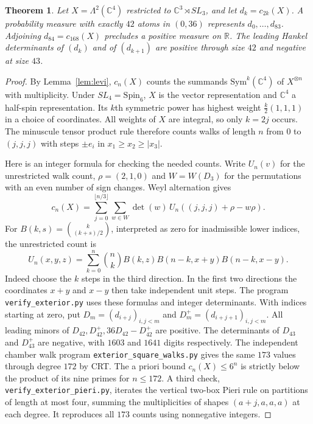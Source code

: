 \documentclass[11pt,reqno]{amsart}
\newtheorem{theorem}{Theorem}[section]
\theoremstyle{definition}
\newcommand{\RR}{\mathbb R}
\newcommand{\CC}{\mathbb C}
\begin{document}
\begin{theorem}\label{thm:exterior-doubled}
Let $X=\Lambda^2(\CC^4)$ restricted to $\CC^3\rtimes SL_3$, and let
$d_k=c_{2k}(X)$. A probability measure with exactly $42$ atoms in $(0,36)$ represents $d_0,\ldots,d_{83}$. Adjoining $d_{84}=c_{168}(X)$ precludes a positive measure on $\RR$. The leading Hankel determinants of $(d_k)$ and of $(d_{k+1})$
are positive through size $42$ and negative at size $43$.
\end{theorem}

\begin{proof}
By Lemma~\ref{lem:levi}, $c_n(X)$ counts the summands
$\mathrm{Sym}^k(\CC^4)$ of $X^{\otimes n}$ with multiplicity. Under
$SL_4=\mathrm{Spin}_6$, $X$ is the vector representation and $\CC^4$ a half-spin
representation. Its $k$th symmetric power has highest weight
$\tfrac k2(1,1,1)$ in a choice of coordinates. All weights of $X$
are integral, so only $k=2j$ occurs. The minuscule tensor product rule
therefore counts walks of length $n$ from $0$ to $(j,j,j)$ with steps
$\pm e_i$ in $x_1\ge x_2\ge|x_3|$.

Here is an integer formula for checking the needed counts.
Write $U_n(v)$ for the unrestricted walk count, $\rho=(2,1,0)$ and
$W=W(D_3)$ for the permutations with an even number of sign changes.
Weyl alternation \cite{GrabinerMagyar} gives
\[
 c_n(X)=\sum_{j=0}^{\lfloor n/3\rfloor}
        \sum_{w\in W}\det(w)\,U_n((j,j,j)+\rho-w\rho).
\]
For $B(k,s)=\binom{k}{(k+s)/2}$, interpreted as zero for inadmissible
lower indices, the unrestricted count is
\[
 U_n(x,y,z)=\sum_{k=0}^{n}\binom nk B(k,z) B(n-k,x+y) B(n-k,x-y).
\]
Indeed choose the $k$ steps in the third direction. In the first two
directions the coordinates $x+y$ and $x-y$ then take independent
unit steps. The program \texttt{verify\_exterior.py} uses these formulas
and integer determinants. With indices starting at zero, put
$D_m=(d_{i+j})_{i,j<m}$ and $D_m^+=(d_{i+j+1})_{i,j<m}$.
All leading minors of $D_{42},D_{42}^+,36D_{42}-D_{42}^+$ are positive.
The determinants of $D_{43}$ and $D_{43}^+$ are negative, with
$1603$ and $1641$ digits respectively. The independent chamber walk
program \texttt{exterior\_square\_walks.py} gives the same $173$ values
through degree $172$ by CRT. The a priori bound $c_n(X)\le6^n$ is
strictly below the product of its nine primes for $n\le172$. A third check, \texttt{verify\_exterior\_pieri.py}, iterates the vertical two-box Pieri rule on partitions of length at most four, summing the multiplicities of shapes $(a+j,a,a,a)$ at each degree. It reproduces all $173$ counts using nonnegative integers.


\end{proof}
\end{document}
